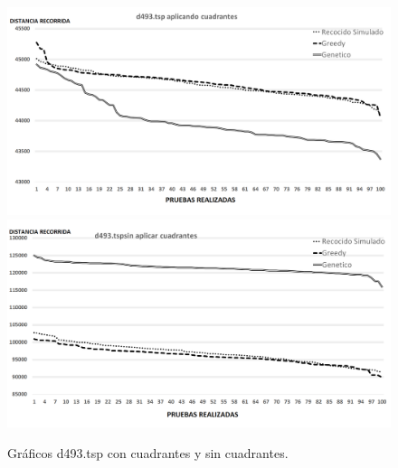  \begin{figure}[hbtp]
    \centering
        \includegraphics[width=1\textwidth]{PruebasResultados/Experimentos_Graficos_Con/d493.png}
        \includegraphics[width=1\textwidth]{PruebasResultados/Experimentos_Graficos_Sin/d493.png}
        \caption{Gráficos d493.tsp con cuadrantes y sin cuadrantes.}
        \label{fig:d493_grafica.png}
\end{figure}
\newpage

